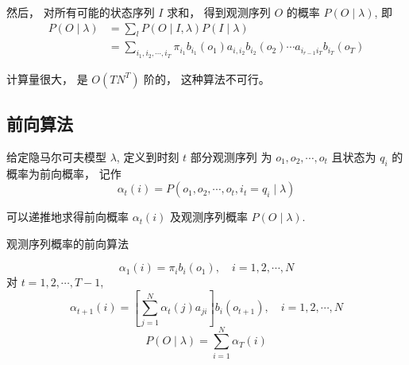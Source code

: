 然后， 对所有可能的状态序列 $ I $ 求和， 得到观测序列 $ O $ 的概率 $ P(O \mid \lambda) $, 即
\begin{equation} 
\begin{aligned}
    P(O \mid \lambda)
&=\sum_{l} P(O \mid I, \lambda) P(I \mid \lambda) \\
&= \sum_{i_{1}, i_{2}, \cdots, i_{T}} \pi_{i_{1}} b_{i_{1}}\left(o_{1}\right) a_{i, i_{2}} b_{i_{2}}\left(o_{2}\right) \cdots a_{i_{r-1} i_{T}} b_{i_{T}}\left(o_{T}\right) 
\end{aligned}
 \end{equation}

\begin{remark}
    计算量很大， 是 $ O\left(T N^{T}\right) $ 阶的， 这种算法不可行。
\end{remark}

\subsection{前向算法}

\begin{definition}[前向概率]
    给定隐马尔可夫模型 $ \lambda $, 定义到时刻 $ t $ 部分观测序列 为 $ o_{1}, o_{2}, \cdots, o_{t} $ 且状态为 $ q_{i} $ 的概率为前向概率， 记作
\begin{equation}
\alpha_{t}(i)=P\left(o_{1}, o_{2}, \cdots, o_{t}, i_{t}=q_{i} \mid \lambda\right)
\end{equation}
\end{definition}

可以递推地求得前向概率 $ \alpha_{t}(i) $ 及观测序列概率 $ P(O \mid \lambda) $.

\begin{algorithm}[htbp]
    \caption{观测序列概率的前向算法}


    \begin{equation} \alpha_{1}(i)=\pi_{i} b_{i}\left(o_{1}\right), \quad i=1,2, \cdots, N \end{equation}\;
    对 $ t=1,2, \cdots, T-1 $,
\begin{equation}
\alpha_{t+1}(i)=\left[\sum_{j=1}^{N} \alpha_{t}(j) a_{j i}\right] b_{i}\left(o_{t+1}\right), \quad i=1,2, \cdots, N
\end{equation}\;
\begin{equation} P(O \mid \lambda)=\sum_{i=1}^{N} \alpha_{T}(i) \end{equation}\;
\end{algorithm}

